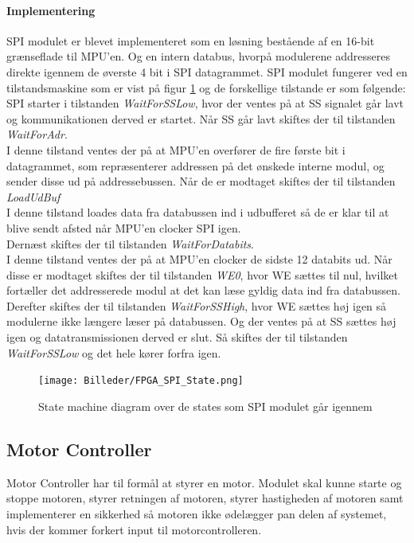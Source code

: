 \paragraph*{Implementering}
SPI modulet er blevet implementeret som en løsning bestående af en 16-bit grænseflade til MPU'en. Og en intern databus, hvorpå modulerene addresseres direkte igennem de øverste 4 bit i SPI datagrammet. SPI modulet fungerer ved en tilstandsmaskine som er vist på figur \ref{fig:FPGA_SPI_State} og de forskellige tilstande er som følgende:\\
SPI starter i tilstanden \textit{WaitForSSLow}, hvor der ventes på at SS signalet går lavt og kommunikationen derved er startet. Når SS går lavt skiftes der til tilstanden \textit{WaitForAdr}. \\ 
I denne tilstand ventes der på at MPU'en overfører de fire første bit i datagrammet, som repræsenterer addressen på det ønskede interne modul, og sender disse ud på addressebussen. Når de er modtaget skiftes der til tilstanden \textit{LoadUdBuf} \\
I denne tilstand loades data fra databussen ind i udbufferet så de er klar til at blive sendt afsted når MPU'en clocker SPI igen.\\
Dernæst skiftes der til tilstanden \textit{WaitForDatabits}. \\
I denne tilstand ventes der på at MPU'en clocker de sidste 12 databits ud. Når disse er modtaget skiftes der til tilstanden \textit{WE0}, hvor WE sættes til nul, hvilket fortæller det addresserede modul at det kan læse gyldig data ind fra databussen. \\ Derefter skiftes der til tilstanden \textit{WaitForSSHigh}, hvor WE sættes høj igen så modulerne ikke længere læser på databussen. Og der ventes på at SS sættes høj igen og datatransmissionen derved er slut. Så skiftes der til tilstanden \textit{WaitForSSLow} og det hele kører forfra igen.

\begin{figure}[ht]
	\begin{center}
		\texttt{[image: Billeder/FPGA\_SPI\_State.png]}
	\end{center}
\caption{State machine diagram over de states som SPI modulet går igennem}
\label{fig:FPGA_SPI_State}
\end{figure}


\subsection{Motor Controller}
Motor Controller har til formål at styrer en motor. Modulet skal kunne starte og stoppe motoren, styrer retningen af motoren, styrer hastigheden af motoren samt implementerer en sikkerhed så motoren ikke ødelægger pan delen af systemet, hvis der kommer forkert input til motorcontrolleren.

